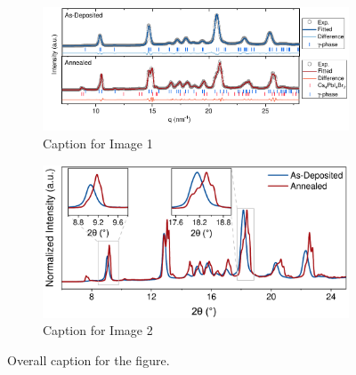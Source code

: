 \begin{figure}[htbp]
    \centering
    \begin{subfigure}[b]{\textwidth}
    \centering
        \includegraphics[width=0.85\linewidth]{chapters/material_properties/images/GIWAXS_Before_After.pdf}
        \caption{Caption for Image 1}
        \label{fig:ch2:giwaxs_before_after:model}
    \end{subfigure}

    \vspace{0.5cm}
    
    \begin{subfigure}[b]{\textwidth}
    \centering
    \hspace{-1.4cm}
        \includegraphics[width=0.68\linewidth]{chapters/material_properties/images/giwaxs_overlayed.pdf}
        \caption{Caption for Image 2}
        \label{fig:ch2:giwaxs_before_after:overlay}
    \end{subfigure}
    
    \caption{Overall caption for the figure.}
    \label{fig:ch2:giwaxs_before_after:}
\end{figure}


